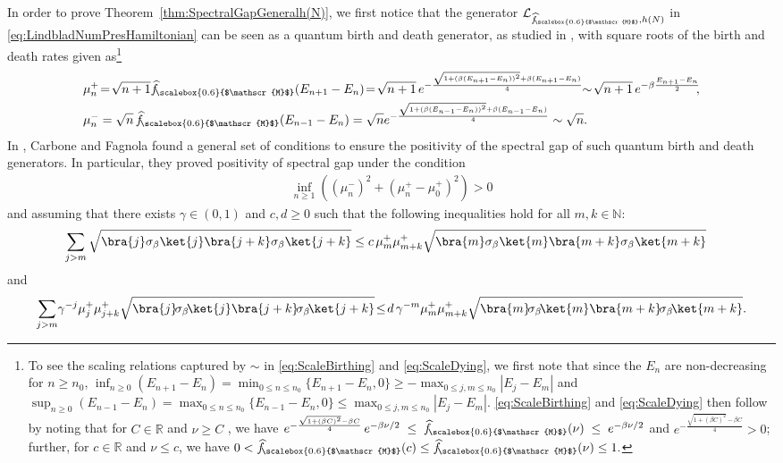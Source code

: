 \documentclass[11pt]{amsart}
\newcommand{\1}{\mathbbm{1}}
\newcommand{\R}{\mathbb{R}}
\newcommand{\N}{\mathbb{N}}
\newcommand{\hatfM}{\widehat{f}_{\!\scalebox{0.6}{$\mathscr{M}$}}
}
\theoremstyle{plain}
\theoremstyle{definition}
\theoremstyle{remark}
\numberwithin{equation}{section}
\begin{document}
\noindent In order to prove  Theorem~\ref{thm:SpectralGapGeneralh(N)}, we first notice 
that the generator $\mathcal{L}_{\hatfM,h(N)}$ in \eqref{eq:LindbladNumPresHamiltonian} can be seen as a quantum birth and death generator, as studied in \cite{carboneFagnola_exponentiall2-convergence_2000}, with square roots of the birth and death rates given as\footnote{To see the scaling relations captured by $\sim$ in \eqref{eq:ScaleBirthing} and \eqref{eq:ScaleDying}, we first note that since the $E_n$ are non-decreasing for $n\ge n_0$, $\inf_{n\ge0}(E_{n+1}-E_n) = \min_{0\le n\le n_0}\{E_{n+1}-E_n,0\} \ge -\max_{0\le j,m\le n_0} |E_j-E_m|$ and $\sup_{n\ge0}(E_{n-1}-E_n) = \max_{0\le n\le n_0}\{E_{n-1}-E_n,0\} \le \max_{0\le j,m\le n_0} |E_j-E_m|.$ \eqref{eq:ScaleBirthing} and \eqref{eq:ScaleDying} then follow by noting
that for $C\in\R$ and $\nu\ge C$
, we have $
e^{-\frac{\sqrt{1+(\beta C)^2}-\beta C}{4}}\,
e^{-\beta \nu/2}
\;\le\;
\hatfM(\nu)
\;\le\;
e^{-\beta \nu/2}$ 
and $e^{-\frac{\sqrt{1+(\beta C)^2}-\beta C}{4}}>0$; further, for $c\in\R$ and $\nu\le c$, we have
$
0<\hatfM(c)\le \hatfM(\nu)\le 1.$
}
\begin{align}
   & \mu^+_n\! =\! \sqrt{n+1}\hatfM(E_{n+1}-E_n) 
   \!=\!\sqrt{n+1} \,e^{-\frac{\sqrt{1+(\beta(E_{n+1}-E_n))^2}+\beta(E_{n+1}-E_n)}{4}}\!\!\sim\!\label{eq:ScaleBirthing} \sqrt{n+1}\,e^{-\beta\frac{E_{n+1}-E_n}{2}}\!\!,\\
    & \mu^-_n = \sqrt{n}\,\hatfM(E_{n-1}-E_n) =\sqrt{n} \label{eq:ScaleDying} e^{-\frac{\sqrt{1+(\beta(E_{n-1}-E_n))^2}+\beta(E_{n-1}-E_n)}{4}} \sim \sqrt{n}.
\end{align}
In  \cite[Theorem 4.2]{carboneFagnola_exponentiall2-convergence_2000}, Carbone and Fagnola found a general set of conditions to ensure the positivity of the spectral gap of such quantum birth and death generators. In particular, they proved positivity of spectral gap under the condition
\begin{align}
\label{eq:FagnolaGapCondition0}
    \inf_{n\ge 1}\left((\mu^-_n)^2 + (\mu^+_n-\mu^+_0)^2\right)>0
\end{align}
and assuming that there exists $\gamma\in(0,1)$ and $c,d\ge 0$ such that the following inequalities hold for all $m,k\in\N$:
\begin{align}
    &\sum_{j>m} \sqrt{\bra{j}\sigma_\beta\ket{j}\bra{j+k}\sigma_\beta\ket{j+k}} \le \label{eq:FagnolaGapCondition1} c\, \mu^+_{m}\mu^+_{m+k} \sqrt{\bra{m}\sigma_\beta\ket{m}\bra{m+k}\sigma_\beta\ket{m+k}}
\end{align}
and
\begin{align}
   \sum_{j>m} \!\gamma^{-j}\mu^+_j\mu^+_{j+k}\sqrt{\bra{j}\!\sigma_\beta\!\ket{j}\bra{j+k}\!\sigma_\beta\!\ket{j+k}}\!\le\! \label{eq:FagnolaGapCondition2} d\, \gamma^{-m}\mu^+_{m}\mu^+_{m+k} \sqrt{\bra{m}\!\sigma_\beta\!\ket{m}\bra{m+k}\!\sigma_\beta\!\ket{m+k}}.
\end{align}
\end{document}
